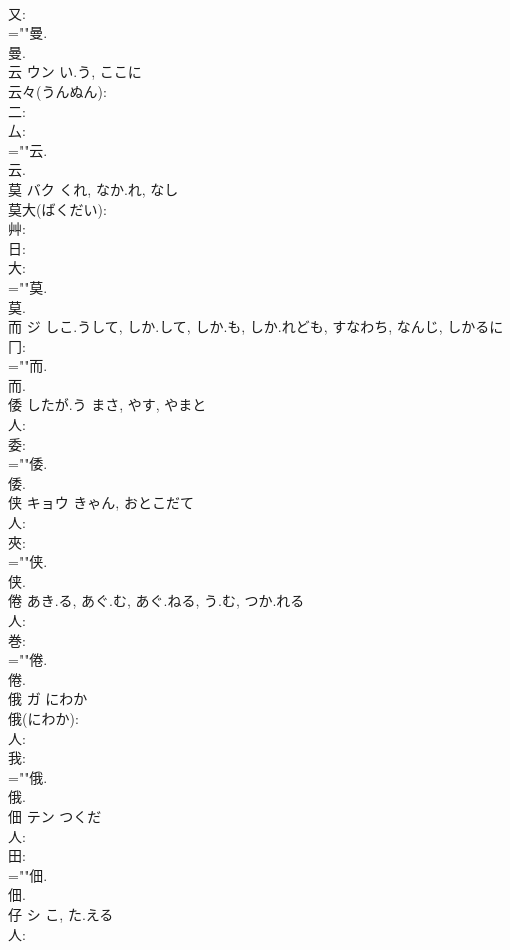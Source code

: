 \documentclass[8pt]{extreport}
\begin{document}
\begin{CJK}{UTF8}{min}
\\	又: 
\\	=""曼.
\\	曼.
\\	云	ウン	い.う, ここに		
\\	云々(うんぬん): 
\\	二: 
\\	厶: 
\\	=""云.
\\	云.
\\	莫	バク	くれ, なか.れ, なし		
\\	莫大(ばくだい): 
\\	艸: 
\\	日: 
\\	大: 
\\	=""莫.
\\	莫.
\\	而	ジ	しこ.うして, しか.して, しか.も, しか.れども, すなわち, なんじ, しかるに		
\\	冂: 
\\	=""而.
\\	而.
\\	倭		したが.う	まさ, やす, やまと			
\\	人: 
\\	委: 
\\	=""倭.
\\	倭.
\\	侠	キョウ	きゃん, おとこだて		
\\	人: 
\\	夾: 
\\	=""侠.
\\	侠.
\\	倦		あき.る, あぐ.む, あぐ.ねる, う.む, つか.れる				
\\	人: 
\\	巻: 
\\	=""倦.
\\	倦.
\\	俄	ガ	にわか		
\\	俄(にわか): 
\\	人: 
\\	我: 
\\	=""俄.
\\	俄.
\\	佃	テン	つくだ		
\\	人: 
\\	田: 
\\	=""佃.
\\	佃.
\\	仔	シ	こ, た.える		
\\	人: 

\end{CJK}
\end{document}
